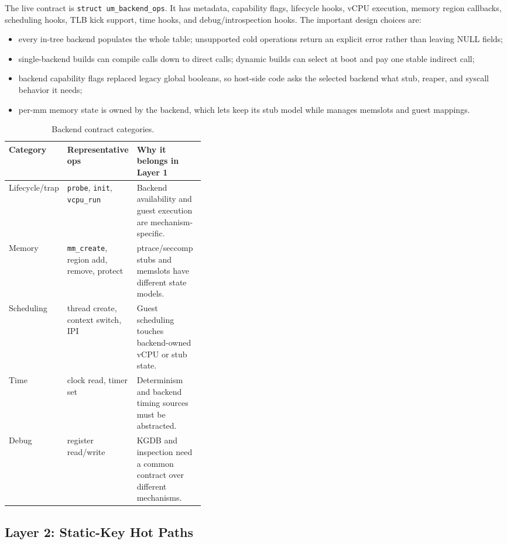 The live contract is \texttt{struct um\_backend\_ops}. It has
metadata, capability flags, lifecycle hooks, vCPU execution, memory
region callbacks, scheduling hooks, TLB kick support, time hooks, and
debug/introspection hooks. The important design choices are:

\begin{itemize}
  \item every in-tree backend populates the whole table; unsupported
        cold operations return an explicit error rather than leaving
        NULL fields;
  \item single-backend builds can compile calls down to direct calls;
        dynamic builds can select at boot and pay one stable indirect
        call;
  \item backend capability flags replaced legacy global booleans, so
        host-side code asks the selected backend what stub, reaper, and
        syscall behavior it needs;
  \item per-mm memory state is owned by the backend, which lets
        \Seccomp{} keep its stub model while \KVMvTwo{} manages
        memslots and guest mappings.
\end{itemize}

\begin{table}[h]
\centering
\caption{Backend contract categories.}
\begin{tabularx}{\linewidth}{@{}p{0.2\linewidth}p{0.19\linewidth}X@{}}
\toprule
Category & Representative ops & Why it belongs in Layer 1 \\
\midrule
Lifecycle/trap & \texttt{probe}, \texttt{init}, \texttt{vcpu\_run} & Backend availability and guest execution are mechanism-specific. \\
Memory & \texttt{mm\_create}, region add, remove, protect & ptrace/seccomp stubs and \KVM{} memslots have different state models. \\
Scheduling & thread create, context switch, IPI & Guest scheduling touches backend-owned vCPU or stub state. \\
Time & clock read, timer set & Determinism and backend timing sources must be abstracted. \\
Debug & register read/write & KGDB and inspection need a common contract over different mechanisms. \\
\bottomrule
\end{tabularx}
\end{table}

\subsection{Layer 2: Static-Key Hot Paths}

